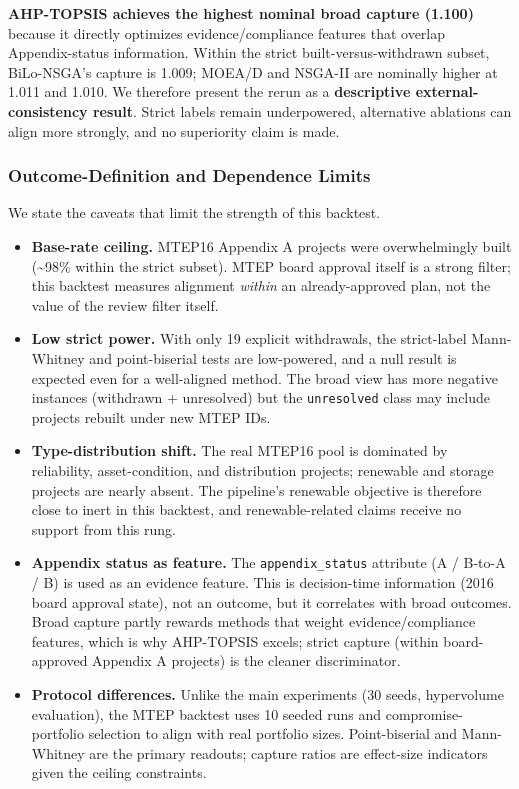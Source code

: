 \documentclass[applsci,article,submit,moreauthors]{Definitions/mdpi}
\providecommand{\tightlist}{\setlength{\itemsep}{0pt}\setlength{\parskip}{0pt}}
\begin{document}
\textbf{AHP-TOPSIS achieves the highest nominal broad capture (1.100)} because it directly optimizes evidence/compliance features that overlap Appendix-status information. Within the strict built-versus-withdrawn subset, BiLo-NSGA's capture is 1.009; MOEA/D and NSGA-II are nominally higher at 1.011 and 1.010. We therefore present the rerun as a \textbf{descriptive external-consistency result}. Strict labels remain underpowered, alternative ablations can align more strongly, and no superiority claim is made.

\subsubsection{Outcome-Definition and Dependence Limits}\label{outcome-definition-and-dependence-limits}

We state the caveats that limit the strength of this backtest.

\begin{itemize}
\tightlist
\item
  \textbf{Base-rate ceiling.} MTEP16 Appendix A projects were overwhelmingly built (\textasciitilde98\% within the strict subset). MTEP board approval itself is a strong filter; this backtest measures alignment \emph{within} an already-approved plan, not the value of the review filter itself.
\item
  \textbf{Low strict power.} With only 19 explicit withdrawals, the strict-label Mann-Whitney and point-biserial tests are low-powered, and a null result is expected even for a well-aligned method. The broad view has more negative instances (withdrawn + unresolved) but the \texttt{unresolved} class may include projects rebuilt under new MTEP IDs.
\item
  \textbf{Type-distribution shift.} The real MTEP16 pool is dominated by reliability, asset-condition, and distribution projects; renewable and storage projects are nearly absent. The pipeline's renewable objective is therefore close to inert in this backtest, and renewable-related claims receive no support from this rung.
\item
  \textbf{Appendix status as feature.} The \texttt{appendix\_status} attribute (A / B-to-A / B) is used as an evidence feature. This is decision-time information (2016 board approval state), not an outcome, but it correlates with broad outcomes. Broad capture partly rewards methods that weight evidence/compliance features, which is why AHP-TOPSIS excels; strict capture (within board-approved Appendix A projects) is the cleaner discriminator.
\item
  \textbf{Protocol differences.} Unlike the main experiments (30 seeds, hypervolume evaluation), the MTEP backtest uses 10 seeded runs and compromise-portfolio selection to align with real portfolio sizes. Point-biserial and Mann-Whitney are the primary readouts; capture ratios are effect-size indicators given the ceiling constraints.
\end{itemize}
\end{document}
